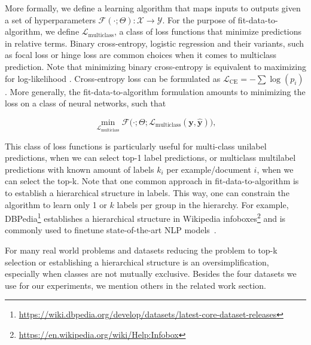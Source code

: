 More formally, we define a learning algorithm that maps inputs to outputs given a set of hyperparameters \(\mathcal{F}(\cdot ; \Theta): \mathcal{X} \rightarrow \mathcal{Y}\). For the purpose of fit-data-to-algorithm,
we define \(\mathcal{L}_{\text {multiclass}}\), a class of loss functions that
minimize predictions in relative terms. Binary cross-entropy, logistic regression and their
variants, such as focal loss or hinge loss are common choices when it comes to
multiclass prediction. Note that minimizing binary cross-entropy is equivalent to maximizing for log-likelihood
\cite[Section 4.3.4]{Bishop}. 
Cross-entropy loss can be formulated as
\(\mathcal{L}_{\text {CE}}=-\sum \log \left(p_{i}\right)\). 
More generally, the fit-data-to-algorithm formulation amounts to minimizing the loss on a class of neural networks, such that

% 
\begin{equation}
\underset{\mathcal{L}_{\text {multiclass}}} {\min} \mathcal{F}\big(\cdot ;
\Theta; \mathcal{L}_{\text {multiclass}} (\mathbf{y}, \hat{\mathbf{y}})\big),
\end{equation}
%

This class of loss functions is particularly useful for multi-class unilabel predictions, when we can select top-1 label predictions, or multiclass multilabel predictions with known amount of labels $k_i$ per example/document $i$, when we can select the top-k. Note that one common approach in fit-data-to-algorithm is to establish a hierarchical structure in labels. This way, one can constrain the algorithm to learn only 1 or $k$ labels per group in the hierarchy. For example, DBPedia\footnote{\url{https://wiki.dbpedia.org/develop/datasets/latest-core-dataset-releases} } establishes a hierarchical structure in Wikipedia infoboxes\footnote{\url{https://en.wikipedia.org/wiki/Help:Infobox} } and is commonly used to finetune state-of-the-art NLP models~\citep[see, e.g.,][]{XLNet, ULMFit}.

For many real world problems and datasets reducing the problem to top-k selection or establishing a hierarchical structure is an oversimplification, especially when classes are not mutually exclusive. Besides the four datasets we use for our experiments, we mention others in the related work section.


